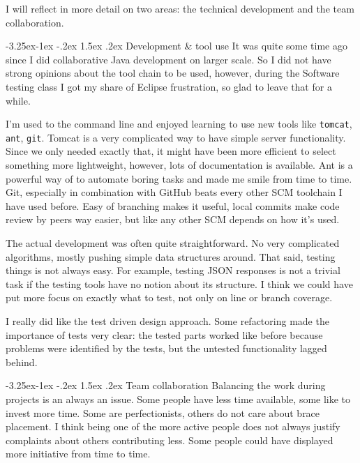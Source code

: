 \documentclass[a4paper]{article}
\makeatletter
\renewcommand\paragraph{\@startsection{paragraph}{4}{\z@}%
  {-3.25ex\@plus -1ex \@minus -.2ex}%
  {1.5ex \@plus .2ex}%
  {\normalfont\normalsize\bfseries}}
\makeatother
\begin{document}
I will reflect in more detail on two areas: the technical development and the team collaboration.

\paragraph{Development \& tool use}
It was quite some time ago since I did collaborative Java development on larger scale. So I did not have strong opinions about the tool chain to be used, however, during the Software testing class I got my share of Eclipse frustration, so glad to leave that for a while.

I'm used to the command line and enjoyed learning to use new tools like \verb|tomcat|, \verb|ant|, \verb|git|. Tomcat is a very complicated way to have simple server functionality. Since we only needed exactly that, it might have been more efficient to select something more lightweight, however, lots of documentation is available. Ant is a powerful way of to automate boring tasks and made me smile from time to time. Git, especially in combination with GitHub beats every other SCM toolchain I have used before. Easy of branching makes it useful, local commits make code review by peers way easier, but like any other SCM depends on how it's used.

The actual development was often quite straightforward. No very complicated algorithms, mostly pushing simple data structures around. That said, testing things is not always easy. For example, testing JSON responses is not a trivial task if the testing tools have no notion about its structure. I think we could have put more focus on exactly what to test, not only on line or branch coverage.

I really did like the test driven design approach. Some refactoring made the importance of tests very clear: the tested parts worked like before because problems were identified by the tests, but the untested functionality lagged behind.


\paragraph{Team collaboration}
Balancing the work during projects is an always an issue. Some people have less time available, some like to invest more time. Some are perfectionists, others do not care about brace placement. I think being one of the more active people does not always justify complaints about others contributing less. Some people could have displayed more initiative from time to time.
\end{document}

